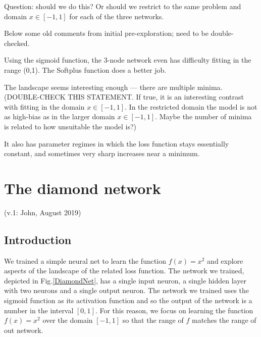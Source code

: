 \documentclass[12pt,a4paper]{article}
\begin{document}
Question: should we do this?  Or should we restrict to the same problem and domain  $x\in[-1,1]$ for
each of the three networks.  

Below some old comments from initial pre-exploration; need to be double-checked.

Using the sigmoid function, the 3-node network even has difficulty fitting in the range (0,1).  The Softplus
function does a better job.

The landscape seems interesting enough --- there are multiple minima. (DOUBLE-CHECK THIS STATEMENT.
If true, it is an interesting contrast with fitting in the domain  $x\in[-1,1]$.  In the
restricted domain the model is not as high-bias as in the larger domain  $x\in[-1,1]$.  Maybe the
number of minima is related to how unsuitable the model is?)


It also has parameter regimes in which the loss function stays essentially constant, and sometimes
very sharp increases near a minimum.








\newpage

\section{The diamond network}

(v.1: John, August 2019)

\subsection{Introduction}

We trained a simple neural net to learn the function $f(x)=x^2$ and explore aspects of the landscape of the related loss function. The network we trained, depicted in Fig.\ref{DiamondNet}, has a single input neuron, a single hidden layer with two neurons and a single output neuron. The network we trained uses the sigmoid function as its activation function and so the output of the network is a number in the interval $[0,1]$. For this reason, we focus on learning the function $f(x)=x^2$ over the domain $[-1,1]$ so that the range of $f$ matches the range of out network.
\end{document}
